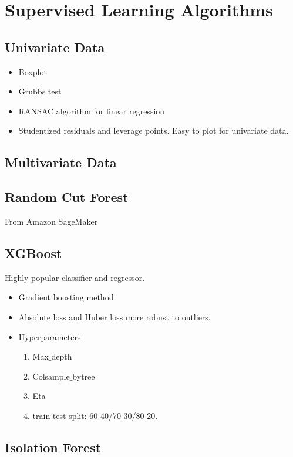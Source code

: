 \documentclass[a4paper, 12pt]{report}
\begin{document}
\chapter{Supervised Learning Algorithms}

\section{Univariate Data}
\begin{itemize}
\item Boxplot
\item Grubbs test
\item RANSAC algorithm for linear regression
\item Studentized residuals and leverage points. Easy to plot for univariate data.
\end{itemize}

\section{Multivariate Data}

\section{Random Cut Forest}
From Amazon SageMaker

\section{XGBoost}
Highly popular classifier and regressor. 
\begin{itemize}
\item Gradient boosting method
\item Absolute loss and Huber loss more robust to outliers.
\item Hyperparameters
\begin{enumerate}
\item Max$\_$depth
\item Colsample$\_$bytree
\item Eta
\item train-test split: 60-40/70-30/80-20.
\end{enumerate}
\end{itemize}

\section{Isolation Forest}
\end{document}
